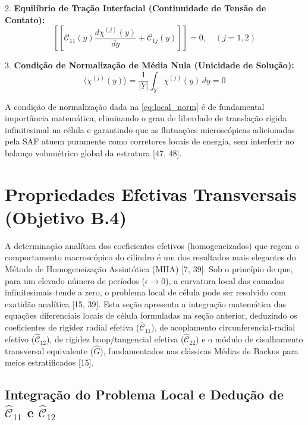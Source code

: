 2. \textbf{Equilíbrio de Tração Interfacial (Continuidade de Tensão de Contato):}
\begin{equation}
  \left[\left[ \mathcal{C}_{11}(y) \frac{d \chi^{(j)}(y)}{d y} + \mathcal{C}_{1j}(y) \right]\right] = 0, \quad (j = 1, 2)
  \label{eq:local_cont_stress}
\end{equation}

3. \textbf{Condição de Normalização de Média Nula (Unicidade de Solução):}
\begin{equation}
  \langle \chi^{(j)}(y) \rangle = \frac{1}{|Y|} \int_Y \chi^{(j)}(y) \, d y = 0
  \label{eq:local_norm}
\end{equation}

A condição de normalização dada na \eqref{eq:local_norm} é de fundamental importância matemática, eliminando o grau de liberdade de translação rígida infinitesimal na célula e garantindo que as flutuações microscópicas adicionadas pela SAF atuem puramente como corretores locais de energia, sem interferir no balanço volumétrico global da estrutura [47, 48].

\section{Propriedades Efetivas Transversais (Objetivo B.4)}

A determinação analítica dos coeficientes efetivos (homogeneizados) que regem o comportamento macroscópico do cilindro é um dos resultados mais elegantes do Método de Homogeneização Assintótica (MHA) [7, 39]. Sob o princípio de que, para um elevado número de períodos ($\epsilon \to 0$), a curvatura local das camadas infinitesimais tende a zero, o problema local de célula pode ser resolvido com exatidão analítica [15, 39]. Esta seção apresenta a integração matemática das equações diferenciais locais de célula formuladas na seção anterior, deduzindo os coeficientes de rigidez radial efetiva ($\hat{\mathcal{C}}_{11}$), de acoplamento circunferencial-radial efetivo ($\hat{\mathcal{C}}_{12}$), de rigidez hoop/tangencial efetiva ($\hat{\mathcal{C}}_{22}$) e o módulo de cisalhamento transversal equivalente ($\hat{G}$), fundamentados nas clássicas Médias de Backus para meios estratificados [15].

\subsection{Integração do Problema Local e Dedução de $\hat{\mathcal{C}}_{11}$ e $\hat{\mathcal{C}}_{12}$}

